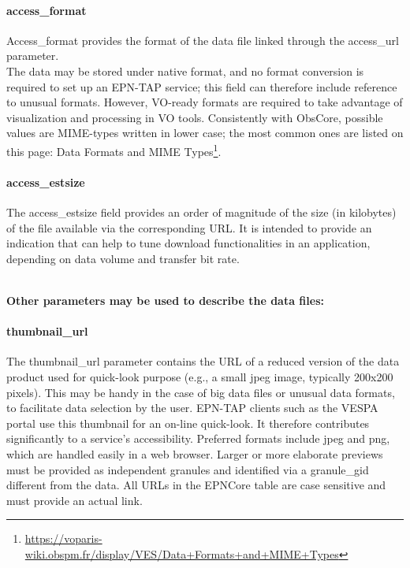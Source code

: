 \documentclass[11pt,a4paper]{ivoa}
\begin{document}
\paragraph{access\_format}

Access\_format provides the format of the data file linked through
the access\_url parameter. \\The data may be stored under native
format, and no format conversion is required to set up an EPN-TAP
service; this field can therefore include reference to unusual
formats. However, VO-ready formats are required to take advantage
of visualization and processing in VO tools. Consistently with
ObsCore, possible values are MIME-types written in lower case;
the most common ones are listed on this page: Data Formats and MIME
Types\footnote{\url{https://voparis-wiki.obspm.fr/display/VES/Data+Formats+and+MIME+Types}}.

\paragraph{access\_estsize}

The access\_estsize field provides an order of magnitude of the size (in
kilobytes) of the file available via the corresponding URL. It is intended
to provide an indication that can help to tune download functionalities
in an application, depending on data volume and transfer bit rate.

\textbf{\\}
\textbf{Other parameters may be used to describe the data files:}

\paragraph{thumbnail\_url}

The thumbnail\_url parameter contains the URL of a reduced version
of the data product used for quick-look purpose (e.g., a small jpeg
image, typically 200x200 pixels). This may be handy in the case of big
data files or unusual data formats, to facilitate data selection by the
user. EPN-TAP clients such as the VESPA portal use this thumbnail for
an on-line quick-look.  It therefore contributes significantly to a
service's accessibility. 
Preferred formats include jpeg and png, which are handled easily
in a web browser. Larger or more elaborate previews must be provided as
independent granules and identified via a granule\_gid different from
the data. All URLs in the EPNCore table are case sensitive and must
provide an actual link.
\end{document}

